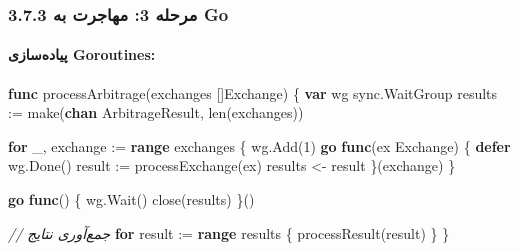 \documentclass[
]{article}
\newenvironment{Shaded}{}{}
\newcommand{\BuiltInTok}[1]{\textcolor[rgb]{0.00,0.50,0.00}{#1}}
\newcommand{\CommentTok}[1]{\textcolor[rgb]{0.38,0.63,0.69}{\textit{#1}}}
\newcommand{\ControlFlowTok}[1]{\textcolor[rgb]{0.00,0.44,0.13}{\textbf{#1}}}
\newcommand{\DecValTok}[1]{\textcolor[rgb]{0.25,0.63,0.44}{#1}}
\newcommand{\KeywordTok}[1]{\textcolor[rgb]{0.00,0.44,0.13}{\textbf{#1}}}
\newcommand{\NormalTok}[1]{#1}
\newcommand{\OperatorTok}[1]{\textcolor[rgb]{0.40,0.40,0.40}{#1}}
\begin{document}
\subsubsection{3.7.3 مرحله 3: مهاجرت به
Go}\label{ux645ux631ux62dux644ux647-3-ux645ux647ux627ux62cux631ux62a-ux628ux647-go}

\paragraph{پیاده‌سازی
Goroutines:}\label{ux67eux6ccux627ux62fux647ux633ux627ux632ux6cc-goroutines}

\begin{Shaded}
\begin{Highlighting}[]
\KeywordTok{func}\NormalTok{ processArbitrage}\OperatorTok{(}\NormalTok{exchanges }\OperatorTok{[]}\NormalTok{Exchange}\OperatorTok{)} \OperatorTok{\{}
    \KeywordTok{var}\NormalTok{ wg sync}\OperatorTok{.}\NormalTok{WaitGroup}
\NormalTok{    results }\OperatorTok{:=} \BuiltInTok{make}\OperatorTok{(}\KeywordTok{chan}\NormalTok{ ArbitrageResult}\OperatorTok{,} \BuiltInTok{len}\OperatorTok{(}\NormalTok{exchanges}\OperatorTok{))}

    \ControlFlowTok{for}\NormalTok{ \_}\OperatorTok{,}\NormalTok{ exchange }\OperatorTok{:=} \KeywordTok{range}\NormalTok{ exchanges }\OperatorTok{\{}
\NormalTok{        wg}\OperatorTok{.}\NormalTok{Add}\OperatorTok{(}\DecValTok{1}\OperatorTok{)}
        \ControlFlowTok{go} \KeywordTok{func}\OperatorTok{(}\NormalTok{ex Exchange}\OperatorTok{)} \OperatorTok{\{}
            \ControlFlowTok{defer}\NormalTok{ wg}\OperatorTok{.}\NormalTok{Done}\OperatorTok{()}
\NormalTok{            result }\OperatorTok{:=}\NormalTok{ processExchange}\OperatorTok{(}\NormalTok{ex}\OperatorTok{)}
\NormalTok{            results }\OperatorTok{\textless{}{-}}\NormalTok{ result}
        \OperatorTok{\}(}\NormalTok{exchange}\OperatorTok{)}
    \OperatorTok{\}}

    \ControlFlowTok{go} \KeywordTok{func}\OperatorTok{()} \OperatorTok{\{}
\NormalTok{        wg}\OperatorTok{.}\NormalTok{Wait}\OperatorTok{()}
        \BuiltInTok{close}\OperatorTok{(}\NormalTok{results}\OperatorTok{)}
    \OperatorTok{\}()}

    \CommentTok{// جمع‌آوری نتایج}
    \ControlFlowTok{for}\NormalTok{ result }\OperatorTok{:=} \KeywordTok{range}\NormalTok{ results }\OperatorTok{\{}
\NormalTok{        processResult}\OperatorTok{(}\NormalTok{result}\OperatorTok{)}
    \OperatorTok{\}}
\OperatorTok{\}}
\end{Highlighting}
\end{Shaded}
\end{document}
